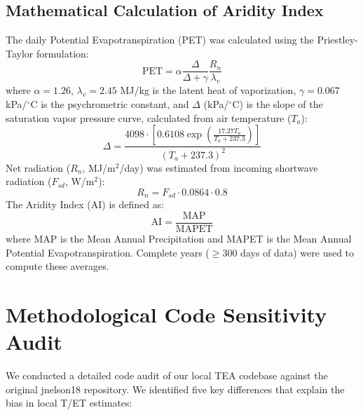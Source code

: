 \documentclass[11pt,a4paper]{article}
\begin{document}
\subsection{Mathematical Calculation of Aridity Index}
The daily Potential Evapotranspiration (PET) was calculated using the Priestley-Taylor formulation:
\begin{equation}
\text{PET} = \alpha \frac{\Delta}{\Delta + \gamma} \frac{R_n}{\lambda_v}
\end{equation}
where $\alpha = 1.26$, $\lambda_v = 2.45$ MJ/kg is the latent heat of vaporization, $\gamma = 0.067$ kPa/$^\circ$C is the psychrometric constant, and $\Delta$ (kPa/$^\circ$C) is the slope of the saturation vapor pressure curve, calculated from air temperature ($T_a$):
\begin{equation}
\Delta = \frac{4098 \cdot \left[0.6108 \exp\left(\frac{17.27 T_a}{T_a + 237.3}\right)\right]}{(T_a + 237.3)^2}
\end{equation}
Net radiation ($R_n$, MJ/m$^2$/day) was estimated from incoming shortwave radiation ($F_{sd}$, W/m$^2$):
\begin{equation}
R_n = F_{sd} \cdot 0.0864 \cdot 0.8
\end{equation}
The Aridity Index (AI) is defined as:
\begin{equation}
\text{AI} = \frac{\text{MAP}}{\text{MAPET}}
\end{equation}
where MAP is the Mean Annual Precipitation and MAPET is the Mean Annual Potential Evapotranspiration. Complete years ($\ge 300$ days of data) were used to compute these averages.

\section{Methodological Code Sensitivity Audit}
We conducted a detailed code audit of our local TEA codebase against the original jnelson18 repository. We identified five key differences that explain the bias in local T/ET estimates:
\end{document}
